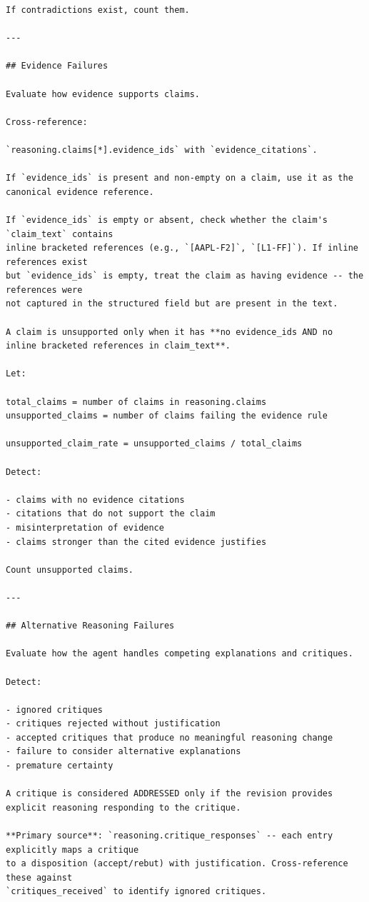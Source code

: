 \documentclass{article}
\begin{document}
\begin{lstlisting}[backgroundcolor=\color{promptbg}]
If contradictions exist, count them.

---

## Evidence Failures

Evaluate how evidence supports claims.

Cross-reference:

`reasoning.claims[*].evidence_ids` with `evidence_citations`.

If `evidence_ids` is present and non-empty on a claim, use it as the canonical evidence reference.

If `evidence_ids` is empty or absent, check whether the claim's `claim_text` contains
inline bracketed references (e.g., `[AAPL-F2]`, `[L1-FF]`). If inline references exist
but `evidence_ids` is empty, treat the claim as having evidence -- the references were
not captured in the structured field but are present in the text.

A claim is unsupported only when it has **no evidence_ids AND no inline bracketed references in claim_text**.

Let:

total_claims = number of claims in reasoning.claims
unsupported_claims = number of claims failing the evidence rule

unsupported_claim_rate = unsupported_claims / total_claims

Detect:

- claims with no evidence citations
- citations that do not support the claim
- misinterpretation of evidence
- claims stronger than the cited evidence justifies

Count unsupported claims.

---

## Alternative Reasoning Failures

Evaluate how the agent handles competing explanations and critiques.

Detect:

- ignored critiques
- critiques rejected without justification
- accepted critiques that produce no meaningful reasoning change
- failure to consider alternative explanations
- premature certainty

A critique is considered ADDRESSED only if the revision provides
explicit reasoning responding to the critique.

**Primary source**: `reasoning.critique_responses` -- each entry explicitly maps a critique
to a disposition (accept/rebut) with justification. Cross-reference these against
`critiques_received` to identify ignored critiques.


\end{lstlisting}
\end{document}
